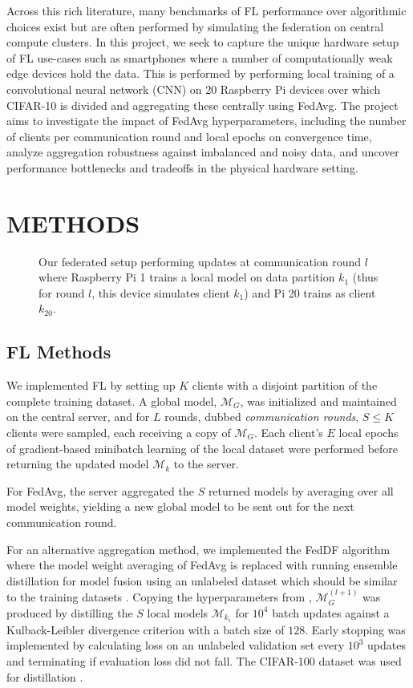 \documentclass{article}
\begin{document}
Across this rich literature, many benchmarks of FL performance over algorithmic choices exist but are often performed by simulating the federation on central compute clusters.
In this project, we seek to capture the unique hardware setup of FL use-cases such as smartphones where a number of computationally weak edge devices hold the data.
This is performed by performing local training of a convolutional neural network (CNN) on 20 Raspberry Pi devices over which CIFAR-10 \cite{alex2009learning} is divided and aggregating these centrally using FedAvg.
The project aims to investigate the impact of FedAvg hyperparameters, including the number of clients per communication round and local epochs on convergence time, analyze aggregation robustness against imbalanced and noisy data, and uncover performance bottlenecks and tradeoffs in the physical hardware setting.

\section{METHODS}%
\label{sec:methods}

\begin{figure}[ht!]
    \centering
    
    \caption{Our federated setup performing updates at communication round $l$ where Raspberry Pi 1 trains a local model on data partition $k_1$ (thus for round $l$, this device simulates client $k_1$) and Pi 20 trains as client $k_{20}$.}
    \label{fig:setup}
\end{figure}\noindent

\subsection{FL Methods}
We implemented FL by setting up $K$ clients with a disjoint partition of the complete training dataset.
A global model, $\mathcal M_G$, was initialized and maintained on the central server, and for $L$ rounds, dubbed \emph{communication rounds}, $S \leq K$ clients were sampled, each receiving a copy of $\mathcal M_G$.
Each client's $E$ local epochs of gradient-based minibatch learning of the local dataset were performed before returning the updated model $\mathcal M_k$ to the server.

For FedAvg, the server aggregated the $S$ returned models by averaging over all model weights, yielding a new global model to be sent out for the next communication round.

For an alternative aggregation method, we implemented the FedDF algorithm where the model weight averaging of FedAvg is replaced with running ensemble distillation for model fusion using an unlabeled dataset which should be similar to the training datasets \cite{lin2020ensemble}.
Copying the hyperparameters from \cite{lin2020ensemble}, $\mathcal M_G^(l + 1)$ was produced by distilling the $S$ local models $\mathcal M_{k_i}$ for $10^4$ batch updates against a Kulback-Leibler  divergence criterion with a batch size of $128$.
Early stopping was implemented by calculating loss on an unlabeled validation set every $10^3$ updates and terminating if evaluation loss did not fall.
The CIFAR-100 dataset was used for distillation \cite{alex2009learning}.
\end{document}
